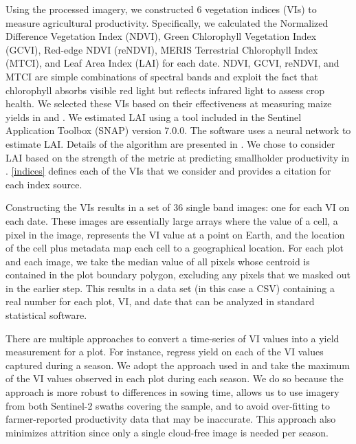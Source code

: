 \documentclass{article}
\begin{document}
Using the processed imagery, we constructed 6 vegetation indices (VIs) to measure agricultural productivity. Specifically, we calculated the Normalized Difference Vegetation Index (NDVI), Green Chlorophyll Vegetation Index (GCVI), Red-edge NDVI (reNDVI), MERIS Terrestrial Chlorophyll Index (MTCI), and Leaf Area Index (LAI) for each date. NDVI, GCVI, reNDVI, and MTCI are simple combinations of spectral bands and exploit the fact that chlorophyll absorbs visible red light but reflects infrared light to assess crop health. We selected these VIs based on their effectiveness at measuring maize yields in \citet{Burke2017Satellite-basedSystems} and \citet{Lobell2019EyesAnalysis}. We estimated LAI using a tool included in the Sentinel Application Toolbox (SNAP) version 7.0.0. The software uses a neural network to estimate LAI. Details of the algorithm are presented in \citet{Weiss2016S2ToolBoxFCOVER}. We chose to consider LAI based on the strength of the metric at predicting smallholder productivity in \citet{Lambert2018EstimatingBelt}. \ref{indices} defines each of the VIs that we consider and provides a citation for each index source. 

Constructing the VIs results in a set of 36 single band images: one for each VI on each date. These images are essentially large arrays where the value of a cell, a pixel in the image, represents the VI value at a point on Earth, and the location of the cell plus metadata map each cell to a geographical location. For each plot and each image, we take the median value of all pixels whose centroid is contained in the plot boundary polygon, excluding any pixels that we masked out in the earlier step. This results in a data set (in this case a CSV) containing a real number for each plot, VI, and date that can be analyzed in standard statistical software. 

There are multiple approaches to convert a time-series of VI values into a yield measurement for a plot. For instance, \citet{Lobell2019EyesAnalysis} regress yield on each of the VI values captured during a season. We adopt the approach used in \citet{Lambert2018EstimatingBelt} and take the maximum of the VI values observed in each plot during each season. We do so because the approach is more robust to differences in sowing time, allows us to use imagery from both Sentinel-2 swaths covering the sample, and to avoid over-fitting to farmer-reported productivity data that may be inaccurate. This approach also minimizes attrition since only a single cloud-free image is needed per season.
\end{document}
